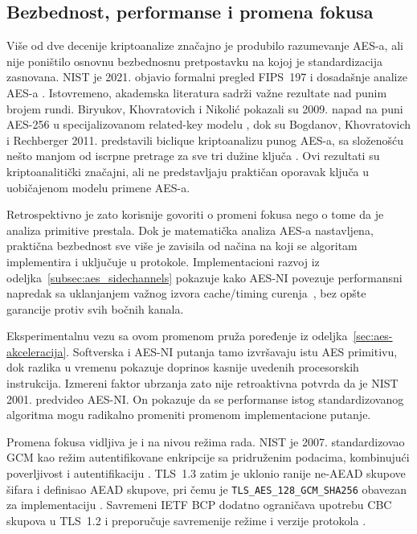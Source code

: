 \subsection{Bezbednost, performanse i promena fokusa}

Više od dve decenije kriptoanalize značajno je produbilo razumevanje
AES-a, ali nije poništilo osnovnu bezbednosnu pretpostavku na kojoj je
standardizacija zasnovana. NIST je 2021. objavio formalni pregled
FIPS~197 i dosadašnje analize AES-a \cite{nist_ir8319}. Istovremeno,
akademska literatura sadrži važne rezultate nad punim brojem rundi.
Biryukov, Khovratovich i Nikolić pokazali su 2009. napad na puni
AES-256 u specijalizovanom related-key modelu
\cite{biryukov2009aes256}, dok su Bogdanov, Khovratovich i Rechberger
2011. predstavili biclique kriptoanalizu punog AES-a, sa složenošću
nešto manjom od iscrpne pretrage za sve tri dužine ključa
\cite{bogdanov2011biclique}. Ovi rezultati su kriptoanalitički značajni,
ali ne predstavljaju praktičan oporavak ključa u uobičajenom modelu
primene AES-a.

Retrospektivno je zato korisnije govoriti o promeni fokusa nego o tome da
je analiza primitive prestala. Dok je matematička analiza AES-a
nastavljena, praktična bezbednost sve više je zavisila od načina na koji
se algoritam implementira i uključuje u protokole. Implementacioni razvoj iz odeljka~\ref{subsec:aes_sidechannels}
pokazuje kako AES-NI povezuje performansni napredak sa uklanjanjem
važnog izvora cache/timing curenja~\cite{gueron2012aesni}, bez opšte
garancije protiv svih bočnih kanala.

Eksperimentalnu vezu sa ovom promenom pruža poređenje iz
odeljka~\ref{sec:aes-akceleracija}. Softverska i AES-NI putanja tamo
izvršavaju istu AES primitivu, dok razlika u vremenu pokazuje doprinos
kasnije uvedenih procesorskih instrukcija. Izmereni faktor ubrzanja zato
nije retroaktivna potvrda da je NIST 2001. predvideo AES-NI. On pokazuje
da se performanse istog standardizovanog algoritma mogu radikalno
promeniti promenom implementacione putanje.

Promena fokusa vidljiva je i na nivou režima rada. NIST je 2007.
standardizovao GCM kao režim autentifikovane enkripcije sa pridruženim
podacima, kombinujući poverljivost i autentifikaciju
\cite{nist_sp80038d}. TLS~1.3 zatim je uklonio ranije ne-AEAD skupove
šifara i definisao AEAD skupove, pri čemu je
\texttt{TLS\_AES\_128\_GCM\_SHA256} obavezan za implementaciju
\cite{rfc8446}. Savremeni IETF BCP dodatno ograničava upotrebu CBC
skupova u TLS~1.2 i preporučuje savremenije režime i verzije protokola
\cite{rfc9325}.

